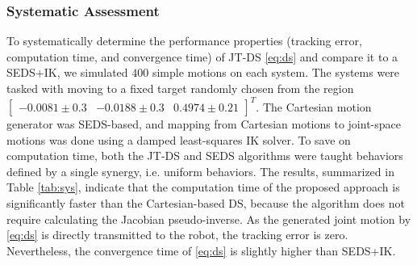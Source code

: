 \documentclass[letterpaper, 10 pt, conference,fleqn]{ieeeconf}
\begin{document}
\subsubsection{Systematic Assessment}
To systematically determine the performance properties (tracking error, computation time, and convergence time) of JT-DS \eqref{eq:ds} and compare it to a SEDS+IK, we simulated $400$ simple motions on each system. The systems were tasked with moving to a fixed target randomly chosen from the region $\begin{bmatrix} -0.0081\pm0.3&-0.0188\pm0.3&0.4974\pm0.21 \end{bmatrix}^T$. The Cartesian motion generator was SEDS-based, and mapping from Cartesian motions to joint-space motions was done using a damped least-squares IK solver. To save on computation time, both the JT-DS and SEDS algorithms were taught behaviors defined by a single synergy, i.e. uniform behaviors.  The results, summarized in Table \ref{tab:sys}, indicate that the computation time of the proposed approach is significantly faster than the Cartesian-based DS, because the algorithm does not require calculating the Jacobian pseudo-inverse. As the generated joint motion by \eqref{eq:ds} is directly transmitted to the robot, the tracking error is zero. Nevertheless, the convergence time of  \eqref{eq:ds} is slightly higher than SEDS+IK.

\begin{table}[t]
	\label{table:2}
	\centering
		\caption{Each simulated trajectory is initialized at $q=[0~\dots~0]^T$. The convergence duration is the time required to move within $0.001$m of the target. The normalized convergence duration is the convergence duration divided by the distance between the initial and target positions.\label{tab:sys}}
		\vspace{-15pt}
\end{table}
\end{document}
